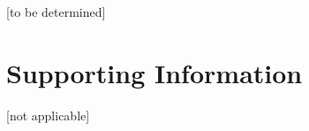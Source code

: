 \documentclass[a4paper,12pt,chapterprefix=false,bibliography=totoc,listof=totoc,]{scrreprt}
\begin{document}
[to be determined]

\chapter{Supporting Information}
[not applicable]
\end{document}
